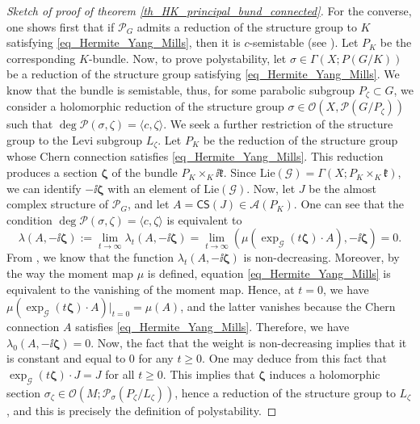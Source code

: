 \begin{proof}[\textit{Sketch of proof of theorem} \ref{th_HK_principal_bund_connected}]
    For the converse, one shows first that if \(\mathcal{P}_G\) admits a reduction of the structure group to \(K\) satisfying \eqref{eq_Hermite_Yang_Mills}, then it is \(c\)-semistable (see \parencite{bradlow2003relative}). Let \(P_K\) be the corresponding \(K\)-bundle. Now, to prove polystability, let \(\sigma \in \Gamma(X; P(G/K))\) be a reduction of the structure group satisfying \eqref{eq_Hermite_Yang_Mills}. We know that the bundle is semistable, thus, for some parabolic subgroup \(P_\zeta \subset G\), we consider a holomorphic reduction of the structure group \(\sigma \in \mathcal{O}(X, \mathcal{P}(G/P_\zeta))\) such that \(\deg \mathcal{P}(\sigma, \zeta)=\langle c, \zeta \rangle\). We seek a further restriction of the structure group to the Levi subgroup \(L_\zeta\). Let \(P_K\) be the reduction of the structure group whose Chern connection satisfies \eqref{eq_Hermite_Yang_Mills}. This reduction produces a section \(\bm{\zeta}\) of the bundle \(P_K \times_K \ii \mathfrak{k}\). Since \(\mathrm{Lie}(\mathscr{G})=\Gamma(X;P_K \times_K \mathfrak{k})\), we can identify \(-\ii \bm{\zeta}\) with an element of \(\mathrm{Lie}(\mathscr{G})\). Now, let \(J\) be the almost complex structure of \(\mathcal{P}_G\), and let \(A=\mathsf{CS}(J)\in \mathscr{A}(P_K)\). One can see that the condition \(\deg \mathcal{P}(\sigma, \zeta)=\langle c, \zeta\rangle\) is equivalent to 
    \[
    \lambda(A, -\ii \bm{\zeta}):=\lim_{t \to \infty} \lambda_t(A, -\ii \bm{\zeta})=\lim_{t\to \infty} ( \mu(\exp_{\mathscr{G}}(t \bm{\zeta})\cdot A), -\ii \bm{\zeta}) =0.
    \]
    From \parencite[Lemma 2.2]{i1999hitchin}, we know that the function \(\lambda_t(A, -\ii \bm{\zeta})\) is non-decreasing. Moreover, by the way the moment map \(\mu\) is defined, equation \eqref{eq_Hermite_Yang_Mills} is equivalent to the vanishing of the moment map. Hence, at \(t=0\), we have \(\mu(\exp_{\mathscr{G}}(t \bm{\zeta})\cdot A)|_{t=0}=\mu(A)\), and the latter vanishes because the Chern connection \(A\) satisfies \eqref{eq_Hermite_Yang_Mills}. Therefore, we have \(\lambda_0(A, -\ii \bm{\zeta})=0\). Now, the fact that the weight is non-decreasing implies that it is constant and equal to \(0\) for any \(t \geq 0\). One may deduce from this fact that \(\exp_{\mathscr{G}}(t \bm{\zeta})\cdot J=J\) for all \(t \geq 0\). This implies that \(\bm{\zeta}\) induces a holomorphic section \(\sigma_\zeta \in \mathcal{O}(M; \mathcal{P}_\sigma(P_\zeta/L_\zeta))\), hence a reduction of the structure group to \(L_\zeta\), and this is precisely the definition of polystability.
\end{proof}

